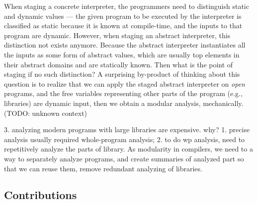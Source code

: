 When staging a concrete interpreter, the programmers need to distinguish static and dynamic values
--- the given program to be executed by the interpreter is classified as static because it is known 
at compile-time, and the inputs to that program are dynamic. 
However, when staging an abstract interpreter, this distinction not exists anymore.  
Because the abstract interpreter instantiates all the inputs as some form of abstract values, which are usually
top elements in their abstract domains and are statically known. 
Then what is the point of staging if no such distinction?
A surprising by-product of thinking about this question is to realize that we can apply the staged
abstract interpreter on \textit{open} programs, and the free variables representing other parts of 
the program (e.g., libraries) are dynamic input, then we obtain a modular analysis, mechanically.
(TODO: unknown context)

3. analyzing modern programs with large libraries are expensive. 
why? 1. precise analysis usually required whole-program analysis; 2. to do wp analysis, need to 
repetitively analyze the parts of library.
As modularity in compilers, we need to a way to separately analyze programs, and create summaries of analyzed 
part so that we can reuse them, remove redundant analyzing of libraries.

\subsection{Contributions}

